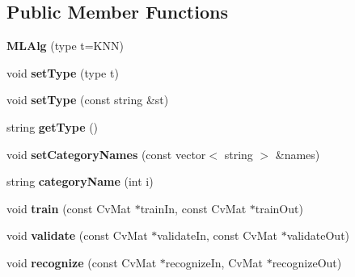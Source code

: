 \subsection*{Public Member Functions}
\begin{DoxyCompactItemize}
\item 
\hypertarget{class_m_l_alg_abe64a2a987f3564d4b8a555bc028a628}{{\bfseries M\-L\-Alg} (type t=K\-N\-N)}\label{class_m_l_alg_abe64a2a987f3564d4b8a555bc028a628}

\item 
\hypertarget{class_m_l_alg_ad91e8880931c1c1a4cffd06dd9abfbe7}{void {\bfseries set\-Type} (type t)}\label{class_m_l_alg_ad91e8880931c1c1a4cffd06dd9abfbe7}

\item 
\hypertarget{class_m_l_alg_a9189e74165b45c44b404660a67bdbfe8}{void {\bfseries set\-Type} (const string \&st)}\label{class_m_l_alg_a9189e74165b45c44b404660a67bdbfe8}

\item 
\hypertarget{class_m_l_alg_a7cc0abdf363c12ec83ee63119b81d19c}{string {\bfseries get\-Type} ()}\label{class_m_l_alg_a7cc0abdf363c12ec83ee63119b81d19c}

\item 
\hypertarget{class_m_l_alg_a44f120e39108980863a3fac855f89106}{void {\bfseries set\-Category\-Names} (const vector$<$ string $>$ \&names)}\label{class_m_l_alg_a44f120e39108980863a3fac855f89106}

\item 
\hypertarget{class_m_l_alg_ad62d73beb4bd63465a4bf24644df420f}{string {\bfseries category\-Name} (int i)}\label{class_m_l_alg_ad62d73beb4bd63465a4bf24644df420f}

\item 
\hypertarget{class_m_l_alg_af50750d469efca6635f056471423c619}{void {\bfseries train} (const Cv\-Mat $\ast$train\-In, const Cv\-Mat $\ast$train\-Out)}\label{class_m_l_alg_af50750d469efca6635f056471423c619}

\item 
\hypertarget{class_m_l_alg_af7cd4f07c40c55a603e3a6dcaf5f287d}{void {\bfseries validate} (const Cv\-Mat $\ast$validate\-In, const Cv\-Mat $\ast$validate\-Out)}\label{class_m_l_alg_af7cd4f07c40c55a603e3a6dcaf5f287d}

\item 
\hypertarget{class_m_l_alg_ae05ba5c235d576a81f2a82eef06448ed}{void {\bfseries recognize} (const Cv\-Mat $\ast$recognize\-In, Cv\-Mat $\ast$recognize\-Out)}\label{class_m_l_alg_ae05ba5c235d576a81f2a82eef06448ed}


\end{DoxyCompactItemize}
